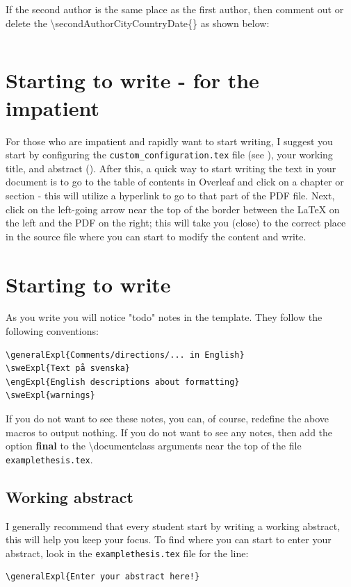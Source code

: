 \documentclass[examplethesis.tex]{subfiles}
\begin{document}
If the second author is the same place as the first author, then comment out or delete the \textbackslash secondAuthorCityCountryDate\{\} as shown below:
\begin{lstlisting}[style=latexExampleForAuthors]
%\secondAuthorCityCountryDate{}
\end{lstlisting}

\section{Starting to write - for the impatient}
\label{sec:writingForTheImpatient}
For those who are impatient and rapidly want to start writing, I suggest you start by configuring the \texttt{custom\_configuration.tex} file (see ), your working title, and abstract (). After this, a quick way to start writing the text in your document is to go to the table of contents in Overleaf and click on a chapter or section - this will utilize a hyperlink to go to that part of the PDF file. Next, click on the left-going arrow near the top of the border between the LaTeX on the left and the PDF on the right; this will take you (close) to the correct place in the source file where you can start to modify the content and write.

\section{Starting to write}
\label{sec:startingToWrite}


As you write you will notice "todo" notes in the template. They follow the following conventions:
\begin{lstlisting}[style=latexExampleForAuthors]
\generalExpl{Comments/directions/... in English}
\sweExpl{Text på svenska}
\engExpl{English descriptions about formatting}
\sweExpl{warnings}
\end{lstlisting}

If you do not want to see these notes, you can, of course, redefine the above macros to output nothing. If you do not want to see any notes, then add the option \textbf{final} to the \textbackslash documentclass arguments near the top of the file \texttt{examplethesis.tex}.

\subsection{Working abstract}
\label{sec:wrtingFirstAbstract}
I generally recommend that every student start by writing a working abstract, this will help you keep your focus. To find where you can start to enter your abstract, look in the \texttt{examplethesis.tex} file for the line:
\begin{lstlisting}[style=latexExampleForAuthors]
\generalExpl{Enter your abstract here!}
\end{lstlisting}
\end{document}
